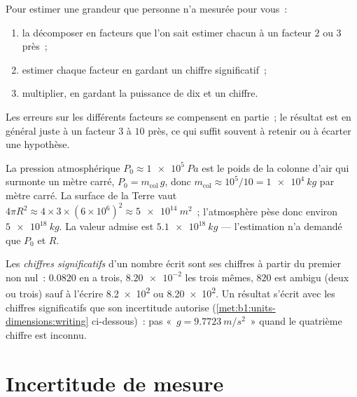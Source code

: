 \begin{method}[Estimer]\label{met:b1:units-dimensions:estimate}
Pour estimer une grandeur que personne n'a mesurée pour vous~:
\begin{enumerate}
  \item la décomposer en facteurs que l'on sait estimer chacun à un
        facteur $2$ ou $3$ près~;
  \item estimer chaque facteur en gardant un chiffre significatif~;
  \item multiplier, en gardant la puissance de dix et un chiffre.
\end{enumerate}
Les erreurs sur les différents facteurs se compensent en partie~; le
résultat est en général juste à un facteur $3$ à $10$ près, ce qui
suffit souvent à retenir ou à écarter une hypothèse.
\end{method}

\begin{example}\label{ex:b1:units-dimensions:atmosphere}
La pression atmosphérique $P_0 \approx \qty{1e5}{Pa}$ est le poids de la
colonne d'air qui surmonte un mètre carré, $P_0 = m_{\text{col}}\,g$,
donc $m_{\text{col}} \approx 10^5/10 = \qty{1e4}{kg}$ par mètre carré.
La surface de la Terre vaut $4\pi R^2 \approx 4 \times 3 \times (6\times10^6)^2
\approx \qty{5e14}{m^2}$~; l'atmosphère pèse donc environ
$\qty{5e18}{kg}$. La valeur admise est $\qty{5.1e18}{kg}$ ---
l'estimation n'a demandé que $P_0$ et $R$.
\end{example}

\begin{definition}\label{def:b1:units-dimensions:sigfig}
Les \emph{chiffres significatifs} d'un nombre écrit sont ses chiffres à
partir du premier non nul~: $0.0820$ en a trois, $\num{8.20e-2}$ les
trois mêmes, $820$ est ambigu (deux ou trois) sauf à l'écrire \num{8.2e2}
ou \num{8.20e2}. Un résultat s'écrit avec les chiffres significatifs que
son incertitude autorise (\cref{met:b1:units-dimensions:writing}
ci-dessous)~: pas «~$g = \qty{9.7723}{m/s^2}$~» quand le quatrième
chiffre est inconnu.
\end{definition}

\section{Incertitude de mesure}

